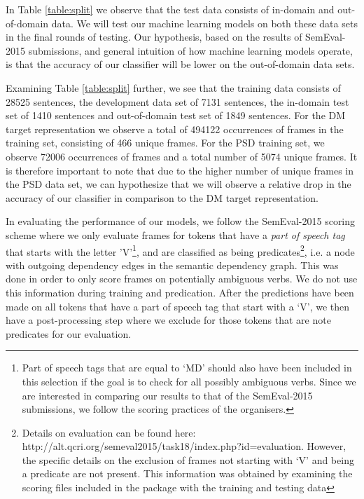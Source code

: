 In Table \ref{table:split} we observe that the test data consists of in-domain and out-of-domain data. We will test our machine learning models on both these data sets in the final rounds of testing. Our hypothesis, based on the results of SemEval-2015 submissions, and general intuition of how machine learning models operate, is that the accuracy of our classifier will be lower on the out-of-domain data sets.

Examining Table \ref{table:split} further, we see that the training data consists of 28525 sentences, the development data set of 7131 sentences, the in-domain test set of 1410 sentences and out-of-domain test set of 1849 sentences. For the DM target representation we observe a total of 494122 occurrences of frames in the training set, consisting of 466 unique frames. For the PSD training set, we observe 72006 occurrences of frames and a total number of 5074 unique frames. It is therefore important to note that due to the higher number of unique frames in the PSD data set, we can hypothesize that we will observe a relative drop in the accuracy of our classifier in comparison to the DM target representation.

In evaluating the performance of our models, we follow the SemEval-2015 scoring scheme where we only evaluate frames for tokens that have a \textit{part of speech tag} that starts with the letter 'V'\footnote{Part of speech tags that are equal to `MD' should also have been included in this selection if the goal is to check for all possibly ambiguous verbs. Since we are interested in comparing our results to that of the SemEval-2015 submissions, we follow the scoring practices of the organisers.}, and are classified as being predicates\footnote{Details on evaluation can be found here: http://alt.qcri.org/semeval2015/task18/index.php?id=evaluation. However, the specific details on the exclusion of frames not starting with `V' and being a predicate are not present. This information was obtained by examining the scoring files included in the package with the training and testing data}, i.e. a node with outgoing dependency edges in the semantic dependency graph. This was done in order to only score frames on potentially ambiguous verbs. We do not use this information during training and predication. After the predictions have been made on all tokens that have a part of speech tag that start with a `V', we then have a post-processing step where we exclude for those tokens that are note predicates for our evaluation.

